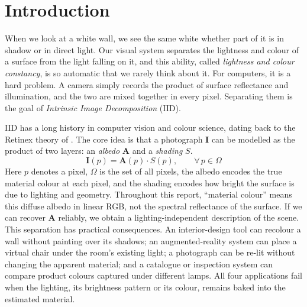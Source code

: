 \chapter{Introduction}
\label{ch:intro}

When we look at a white wall, we see the same white whether part of it is in shadow or
in direct light.
Our visual system separates the lightness and colour of a surface from the light falling on
it, and this ability, called \emph{lightness and colour constancy}, is so automatic that we
rarely think about it.
For computers, it is a hard problem.
A camera simply records the product of surface reflectance and illumination, and the two
are mixed together in every pixel.
Separating them is the goal of \emph{Intrinsic Image Decomposition} (IID).

IID has a long history in computer vision and colour science, dating back to the
Retinex theory of .
The core idea is that a photograph $\mathbf{I}$ can be modelled as the product of
two layers: an \emph{albedo} $\mathbf{A}$ and a \emph{shading} $S$.
\begin{equation}
  \mathbf{I}(p) = \mathbf{A}(p) \cdot S(p), \qquad \forall\, p \in \Omega
  \label{eq:iid_model}
\end{equation}
Here $p$ denotes a pixel, $\Omega$ is the set of all pixels, the albedo encodes
the true material colour at each pixel, and the shading encodes how bright the
surface is due to lighting and geometry.
Throughout this report, ``material colour'' means this diffuse albedo in linear RGB, not the
spectral reflectance of the surface.
If we can recover $\mathbf{A}$ reliably, we obtain a lighting-independent
description of the scene. This separation has practical consequences. An
interior-design tool can recolour a wall without painting over its shadows; an
augmented-reality system can place a virtual chair under the room's existing
light; a photograph can be re-lit without changing the apparent material; and a
catalogue or inspection system can compare product colours captured under
different lamps. All four applications fail when the lighting, its brightness
pattern or its colour, remains baked into the estimated material.

